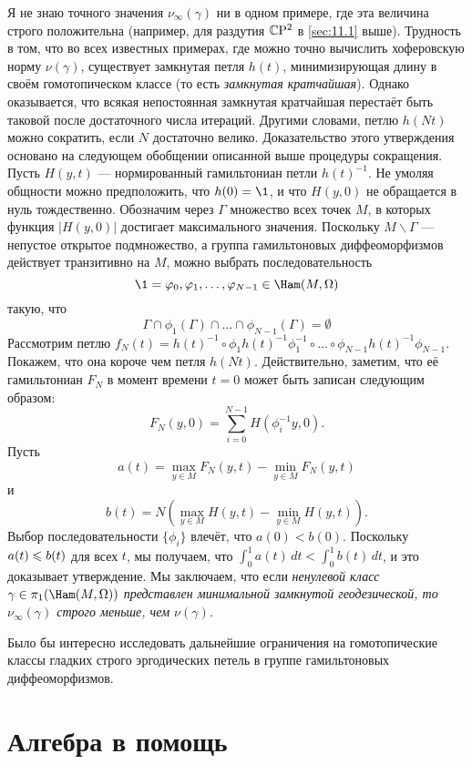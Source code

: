Я не знаю точного значения $\nu_\infty (\gamma)$ ни в одном примере, где эта величина строго положительна (например, для раздутия $\mathbb{C}\mathrm{P}^2$ в \ref{sec:11.1} выше).
Трудность в том, что во всех известных примерах, где можно точно вычислить хоферовскую норму $\nu(\gamma)$, существует замкнутая петля $h(t)$, минимизирующая длину в своём гомотопическом классе (то есть \emph{замкнутая кратчайшая}).
Однако оказывается, что всякая непостоянная замкнутая кратчайшая перестаёт быть таковой после достаточного числа итераций.
Другими словами, петлю $h(Nt)$ можно сократить, если $N$ достаточно велико.
Доказательство этого утверждения основано на следующем обобщении описанной выше процедуры сокращения.
Пусть $H(y, t)$ --- нормированный гамильтониан петли $h(t)^{-1}$.
Не умоляя общности можно предположить, что $h(0) = \1$, и что $H(y,0)$ не обращается в нуль тождественно.
Обозначим через $\Gamma$ множество всех точек $M$, в которых функция $|H(y, 0)|$ достигает максимального значения.
Поскольку $M \backslash \Gamma$ --- непустое открытое подмножество, а группа гамильтоновых диффеоморфизмов действует транзитивно на $M$, можно выбрать последовательность 
\[\1=\phi_0,\phi_1,\dots,\phi_{N-1}\in\Ham(M,\Omega)\]
такую, что 
\[\Gamma\cap\phi_1(\Gamma)\cap\dots\cap\phi_{N-1}(\Gamma)=\emptyset\]
Рассмотрим петлю $f_N(t) = h(t)^{-1} \circ \phi_1h(t)^{-1}\phi_1^{-1} \circ \dots \circ \phi_{N-1}h(t)^{-1}\phi_{N-1}$.
Покажем, что она короче чем петля $h(Nt)$.
Действительно, заметим, что её гамильтониан $F_N$ в момент времени $t = 0$ может быть записан следующим образом:
\[F_N(y,0) = \sum_{i=0}^{N-1} H(\phi_i^{-1}y, 0).\]
Пусть
\[a(t)
=
\max_{y\in M} F_N(y, t) - \min_{y\in M}  F_N(y, t)
\]
и
\[b(t)
=
N(\max_{y\in M} H(y, t) - \min_{y\in M}  H(y, t)).
\]
Выбор последовательности $\{\phi_i\}$ влечёт, что $a(0) < b(0)$.
Поскольку $a(t) \z\le b(t)$ для всех $t$, мы получаем, что $\int_0^1a(t)\,dt < \int_0^1 b(t)\,dt$, и это доказывает утверждение.
Мы заключаем, что если \textit{ненулевой класс $\gamma\in \pi_1(\Ham(M, \Omega))$ представлен минимальной замкнутой геодезической, то $\nu_\infty (\gamma)$ строго меньше, чем $\nu(\gamma)$.}

Было бы интересно исследовать дальнейшие ограничения на гомотопические классы гладких строго эргодических петель в группе гамильтоновых диффеоморфизмов.

\section{Алгебра в помощь}

